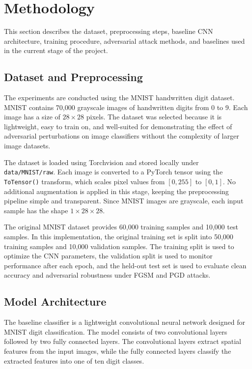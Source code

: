 \documentclass[conference,10pt]{IEEEtran}
\begin{document}
\section{Methodology}

This section describes the dataset, preprocessing steps, baseline CNN architecture, training procedure, adversarial attack methods, and baselines used in the current stage of the project.

\subsection{Dataset and Preprocessing}

The experiments are conducted using the MNIST handwritten digit dataset. MNIST contains 70,000 grayscale images of handwritten digits from 0 to 9. Each image has a size of $28 \times 28$ pixels. The dataset was selected because it is lightweight, easy to train on, and well-suited for demonstrating the effect of adversarial perturbations on image classifiers without the complexity of larger image datasets.

The dataset is loaded using Torchvision and stored locally under \texttt{data/MNIST/raw}. Each image is converted to a PyTorch tensor using the \texttt{ToTensor()} transform, which scales pixel values from $[0,255]$ to $[0,1]$. No additional augmentation is applied in this stage, keeping the preprocessing pipeline simple and transparent. Since MNIST images are grayscale, each input sample has the shape $1 \times 28 \times 28$.

The original MNIST dataset provides 60,000 training samples and 10,000 test samples. In this implementation, the original training set is split into 50,000 training samples and 10,000 validation samples. The training split is used to optimize the CNN parameters, the validation split is used to monitor performance after each epoch, and the held-out test set is used to evaluate clean accuracy and adversarial robustness under FGSM and PGD attacks.

\subsection{Model Architecture}

The baseline classifier is a lightweight convolutional neural network designed for MNIST digit classification. The model consists of two convolutional layers followed by two fully connected layers. The convolutional layers extract spatial features from the input images, while the fully connected layers classify the extracted features into one of ten digit classes.
\end{document}
